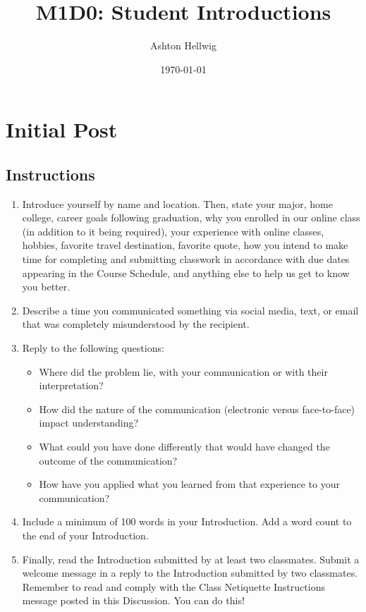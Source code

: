 \documentclass[stu,12pt]{apa7}
\title{%
    M1D0: Student Introductions
  }
\author{Ashton Hellwig}
\date{\today}
\begin{document}
  \maketitle

  \section{Initial Post}
    \subsection*{Instructions}
      \begin{enumerate}
        \item Introduce yourself by name and location. Then, state your major,
          home college, career goals following graduation, why you enrolled in
          our online class (in addition to it being required), your experience
          with online classes, hobbies, favorite travel destination, favorite
          quote, how you intend to make time for completing and submitting
          classwork in accordance with due dates appearing in the Course
          Schedule, and anything else to help us get to know you better.
        \item Describe a time you communicated something via social media, text,
          or email that was completely misunderstood by the recipient.
        \item Reply to the following questions:
          \begin{itemize}
            \item Where did the problem lie, with your communication or with
              their interpretation?
            \item How did the nature of the communication (electronic versus
              face-to-face) impact understanding?
            \item What could you have done differently that would have changed
              the outcome of the communication?
            \item How have you applied what you learned from that experience to
              your communication?
          \end{itemize}
        \item Include a minimum of 100 words in your Introduction. Add a word
          count to the end of your Introduction.
        \item Finally, read the Introduction submitted by at least two
          classmates. Submit a welcome message in a reply to the Introduction
          submitted by two classmates. Remember to read and comply with the
          Class Netiquette Instructions message posted in this Discussion. You
          can do this!
      \end{enumerate}
\end{document}
